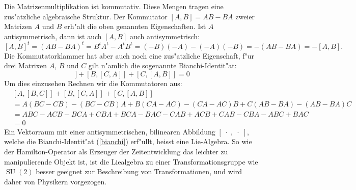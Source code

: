 Die Matrizenmultiplikation ist kommutativ.
Diese Mengen tragen eine zus"atzliche algebraische Struktur. 
Der Kommutator $[A,B]=AB-BA$ zweier Matrizen $A$ und $B$ erh"alt
die oben genannten Eigenschaften. Ist $A$ antisymmetrisch, dann
ist auch $[A,B]$ auch antisymmetrisch:
\[
[A,B]^t
=
(AB-BA)^t
=
B^tA^t-A^tB^t
=
(-B)(-A)-(-A)(-B)
=
-(AB-BA)
=
-[A,B].
\]
Die Kommutatorklammer hat aber auch noch eine zus"atzliche Eigenschaft,
f"ur drei Matrixen $A$, $B$ und $C$ gilt n"amlich die sogenannte
Bianchi-Identit"at:
\begin{equation}
[A,[B, C]]
+
[B,[C, A]]
+
[C,[A, B]]
=
0
\label{bianchi}
\end{equation}
Um dies einzusehen Rechnen wir die Kommutatoren aus:
\begin{align*}
&
[A,[B, C]]
+
[B,[C, A]]
+
[C,[A, B]]
\\
&=
A(BC-CB)-(BC-CB)A
+
B(CA-AC)-(CA-AC)B
+
C(AB-BA)-(AB-BA)C
\\
&=
ABC-ACB-BCA+CBA
+
BCA-BAC-CAB+ACB
+
CAB-CBA-ABC+BAC
\\
&=0
\end{align*}
Ein Vektorraum mit einer antisymmetrischen, bilinearen Abbildung
$[\;\cdot\;,\;\cdot\;]$,
welche die Bianchi-Identit"at (\ref{bianchi}) erf"ullt, heisst eine
Lie-Algebra.
So wie der Hamilton-Operator als Erzeuger der Zeitentwicklung das
leichter zu manipulierende Objekt ist, ist die Liealgebra zu einer
Transformationsgruppe wie $\operatorname{SU}(2)$ besser geeignet
zur Beschreibung von Transformationen, und wird daher von Physikern
vorgezogen.

